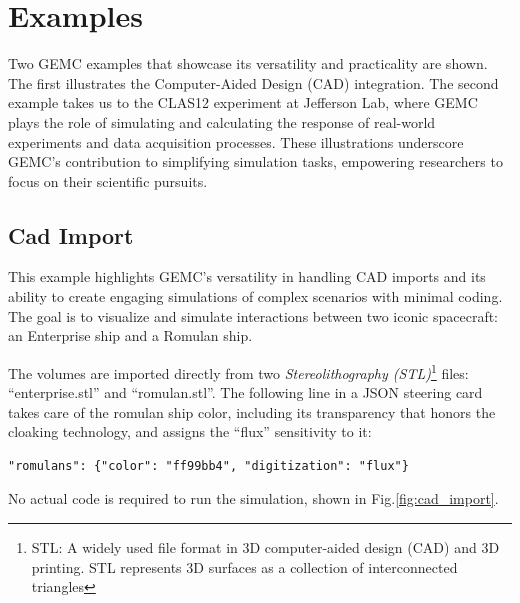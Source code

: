 \section{Examples}
\label{sec:examples}

Two GEMC examples that showcase its versatility and practicality are shown.
The first illustrates the Computer-Aided Design (CAD) integration.
The second example takes us to the CLAS12 experiment at Jefferson Lab, where GEMC plays the role
of simulating and calculating the response of real-world experiments and data acquisition processes.
These illustrations underscore GEMC's contribution to simplifying simulation tasks,
empowering researchers to focus on their scientific pursuits.

\subsection{Cad Import}
\label{subsec:cad_import}

This example highlights GEMC's versatility in handling CAD imports and its ability to create engaging
simulations of complex scenarios with minimal coding.
The goal is to visualize and simulate interactions between two iconic spacecraft: an Enterprise ship and a Romulan ship.

The volumes are imported directly from two \emph{Stereolithography (STL)}\footnote{STL: A widely used file format
in 3D computer-aided design (CAD) and 3D printing. STL represents 3D surfaces as a collection of interconnected triangles}
files: ``enterprise.stl'' and ``romulan.stl''.
The following line in a JSON steering card takes care of the romulan ship color, including its transparency that honors the cloaking technology,
and assigns the ``flux'' sensitivity to it:

\begin{verbatim}
"romulans": {"color": "ff99bb4", "digitization": "flux"}
\end{verbatim}


No actual code is required to run the simulation,  shown in Fig.\ref{fig:cad_import}.



